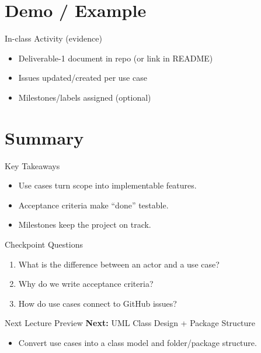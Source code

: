 \documentclass{beamer}
\begin{document}
\section{Demo / Example}
\label{sec:demo}

\begin{frame}{In-class Activity (evidence)}
  \begin{itemize}[<+->]
    \item Deliverable-1 document in repo (or link in README)
    \item Issues updated/created per use case
    \item Milestones/labels assigned (optional)
  \end{itemize}
  \slidesources{\OOPSUnitVISources}
\end{frame}


\section{Summary}
\label{sec:summary}

\begin{frame}{Key Takeaways}
  \begin{itemize}[<+->]
    \item Use cases turn scope into implementable features.
    \item Acceptance criteria make ``done'' testable.
    \item Milestones keep the project on track.
  \end{itemize}
  \slidesources{\OOPSUnitVISources}
\end{frame}

\begin{frame}{Checkpoint Questions}
  \begin{enumerate}[<+->]
    \item What is the difference between an actor and a use case?
    \item Why do we write acceptance criteria?
    \item How do use cases connect to GitHub issues?
  \end{enumerate}
  \slidesources{\OOPSUnitVISources}
\end{frame}

\begin{frame}{Next Lecture Preview}
  \textbf{Next:} UML Class Design + Package Structure
  \vspace{0.6em}
  \begin{itemize}[<+->]
    \item Convert use cases into a class model and folder/package structure.
  \end{itemize}
  \slidesources{\OOPSUnitVISources}
\end{frame}
\end{document}

